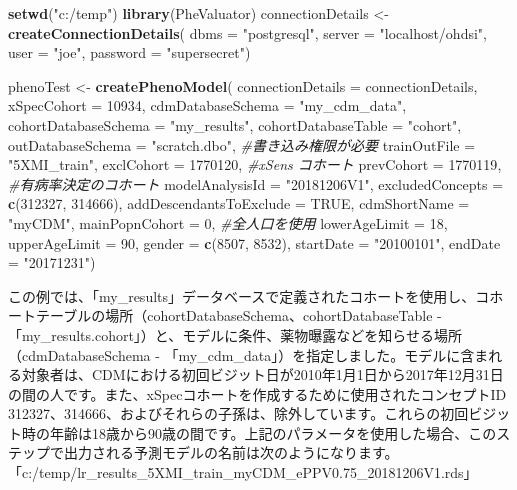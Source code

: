 \documentclass[
  11pt]{book}
\newenvironment{Shaded}{\begin{snugshade}}{\end{snugshade}}
\newcommand{\AttributeTok}[1]{\textcolor[rgb]{0.13,0.29,0.53}{#1}}
\newcommand{\CommentTok}[1]{\textcolor[rgb]{0.56,0.35,0.01}{\textit{#1}}}
\newcommand{\ConstantTok}[1]{\textcolor[rgb]{0.56,0.35,0.01}{#1}}
\newcommand{\DecValTok}[1]{\textcolor[rgb]{0.00,0.00,0.81}{#1}}
\newcommand{\FunctionTok}[1]{\textcolor[rgb]{0.13,0.29,0.53}{\textbf{#1}}}
\newcommand{\NormalTok}[1]{#1}
\newcommand{\OtherTok}[1]{\textcolor[rgb]{0.56,0.35,0.01}{#1}}
\newcommand{\StringTok}[1]{\textcolor[rgb]{0.31,0.60,0.02}{#1}}
\theoremstyle{definition}
\theoremstyle{definition}
\theoremstyle{definition}
\theoremstyle{definition}
\theoremstyle{remark}
\begin{document}
\begin{Shaded}
\begin{Highlighting}[]
\FunctionTok{setwd}\NormalTok{(}\StringTok{"c:/temp"}\NormalTok{)}
\FunctionTok{library}\NormalTok{(PheValuator)}
\NormalTok{connectionDetails }\OtherTok{\textless{}{-}} \FunctionTok{createConnectionDetails}\NormalTok{(}
  \AttributeTok{dbms =} \StringTok{"postgresql"}\NormalTok{,}
  \AttributeTok{server =} \StringTok{"localhost/ohdsi"}\NormalTok{,}
  \AttributeTok{user =} \StringTok{"joe"}\NormalTok{,}
  \AttributeTok{password =} \StringTok{"supersecret"}\NormalTok{)}

\NormalTok{phenoTest }\OtherTok{\textless{}{-}} \FunctionTok{createPhenoModel}\NormalTok{(}
  \AttributeTok{connectionDetails =}\NormalTok{ connectionDetails,}
  \AttributeTok{xSpecCohort =} \DecValTok{10934}\NormalTok{,}
  \AttributeTok{cdmDatabaseSchema =} \StringTok{"my\_cdm\_data"}\NormalTok{,}
  \AttributeTok{cohortDatabaseSchema =} \StringTok{"my\_results"}\NormalTok{,}
  \AttributeTok{cohortDatabaseTable =} \StringTok{"cohort"}\NormalTok{,}
  \AttributeTok{outDatabaseSchema =} \StringTok{"scratch.dbo"}\NormalTok{, }\CommentTok{\#書き込み権限が必要}
  \AttributeTok{trainOutFile =} \StringTok{"5XMI\_train"}\NormalTok{,}
  \AttributeTok{exclCohort =} \DecValTok{1770120}\NormalTok{, }\CommentTok{\#xSens コホート}
  \AttributeTok{prevCohort =} \DecValTok{1770119}\NormalTok{, }\CommentTok{\#有病率決定のコホート}
  \AttributeTok{modelAnalysisId =} \StringTok{"20181206V1"}\NormalTok{,}
  \AttributeTok{excludedConcepts =} \FunctionTok{c}\NormalTok{(}\DecValTok{312327}\NormalTok{, }\DecValTok{314666}\NormalTok{),}
  \AttributeTok{addDescendantsToExclude =} \ConstantTok{TRUE}\NormalTok{,}
  \AttributeTok{cdmShortName =} \StringTok{"myCDM"}\NormalTok{,}
  \AttributeTok{mainPopnCohort =} \DecValTok{0}\NormalTok{, }\CommentTok{\#全人口を使用}
  \AttributeTok{lowerAgeLimit =} \DecValTok{18}\NormalTok{,}
  \AttributeTok{upperAgeLimit =} \DecValTok{90}\NormalTok{,}
  \AttributeTok{gender =} \FunctionTok{c}\NormalTok{(}\DecValTok{8507}\NormalTok{, }\DecValTok{8532}\NormalTok{),}
  \AttributeTok{startDate =} \StringTok{"20100101"}\NormalTok{,}
  \AttributeTok{endDate =} \StringTok{"20171231"}\NormalTok{)}
\end{Highlighting}
\end{Shaded}

この例では、「my\_results」データベースで定義されたコホートを使用し、コホートテーブルの場所（cohortDatabaseSchema、cohortDatabaseTable - 「my\_results.cohort」）と、モデルに条件、薬物曝露などを知らせる場所（cdmDatabaseSchema - 「my\_cdm\_data」）を指定しました。モデルに含まれる対象者は、CDMにおける初回ビジット日が2010年1月1日から2017年12月31日の間の人です。また、xSpecコホートを作成するために使用されたコンセプトID 312327、314666、およびそれらの子孫は、除外しています。これらの初回ビジット時の年齢は18歳から90歳の間です。上記のパラメータを使用した場合、このステップで出力される予測モデルの名前は次のようになります。「c:/temp/lr\_results\_5XMI\_train\_myCDM\_ePPV0.75\_20181206V1.rds」
\end{document}
